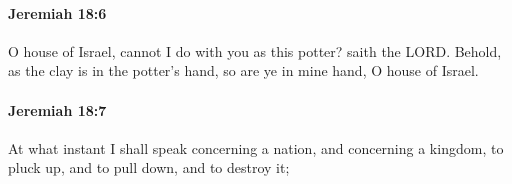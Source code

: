 		\paragraph{Jeremiah 18:6} %
			\label{JEREMIAH-18-6}

			O house of Israel, cannot I do with you as this potter? saith the LORD. Behold, as the clay is in the potter’s hand, so are ye in mine hand, O house of Israel.


		\paragraph{Jeremiah 18:7} %
			\label{JEREMIAH-18-7}

			At what instant I shall speak concerning a nation, and concerning a kingdom, to pluck up, and to pull down, and to destroy it;


